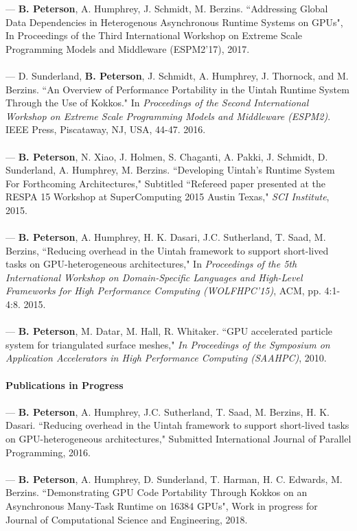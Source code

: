 \documentclass[12pt]{article}
\begin{document}
\cite{espm2-brad}  --- \textbf{B. Peterson}, A. Humphrey, J. Schmidt, M. Berzins.  ``Addressing Global Data Dependencies in Heterogenous Asynchronous Runtime Systems on GPUs", In {Proceedings of the Third International Workshop on Extreme Scale Programming Models and Middleware (ESPM2'17)}, 2017. \\
\\
\cite{espm2-16}  --- D. Sunderland, \textbf{B. Peterson}, J. Schmidt, A. Humphrey, J. Thornock, and M. Berzins. ``An Overview of Performance Portability in the Uintah Runtime System Through the Use of Kokkos."  In \textit{Proceedings of the Second International Workshop on Extreme Scale Programming Models and Middleware (ESPM2)}. IEEE Press, Piscataway, NJ, USA, 44-47. 2016.\\
\\
\cite{respa-techreport-15} --- \textbf{B. Peterson}, N. Xiao, J. Holmen, S. Chaganti, A. Pakki, J. Schmidt, D. Sunderland, A. Humphrey, M. Berzins. ``Developing Uintah's Runtime System For Forthcoming Architectures," Subtitled ``Refereed paper presented at the RESPA 15 Workshop at SuperComputing 2015 Austin Texas," \textit{SCI Institute}, 2015.\\
\\
\cite{wolfhpc15} --- \textbf{B. Peterson}, A. Humphrey, H. K. Dasari, J.C. Sutherland, T. Saad, M. Berzins, ``Reducing overhead in the Uintah framework to support short-lived tasks on GPU-heterogeneous architectures," In \textit{Proceedings of the 5th International Workshop on Domain-Specific Languages and High-Level Frameworks for High Performance Computing (WOLFHPC'15)}, ACM, pp. 4:1-4:8. 2015.\\
\\
\cite{saahpc-2010-brad} --- \textbf{B. Peterson}, M. Datar, M. Hall, R. Whitaker.  ``GPU accelerated particle system for triangulated surface meshes," \textit{In Proceedings of the Symposium on Application Accelerators in High Performance Computing (SAAHPC)}, 2010.\\
\\
\textbf{Publications in Progress}\\
\\
\cite{ijpp16} --- \textbf{B. Peterson},  A. Humphrey, J.C. Sutherland, T. Saad, M. Berzins, H. K. Dasari. ``Reducing overhead in the Uintah framework to support short-lived tasks on GPU-heterogeneous architectures," Submitted International Journal of Parallel Programming, 2016.\\
\\
\cite{jocs18} --- \textbf{B. Peterson}, A. Humphrey, D. Sunderland, T. Harman, H. C. Edwards, M. Berzins. ``Demonstrating GPU Code Portability Through Kokkos on an Asynchronous Many-Task Runtime on 16384 GPUs",  Work in progress for Journal of Computational Science and Engineering, 2018.\\
\end{document}
